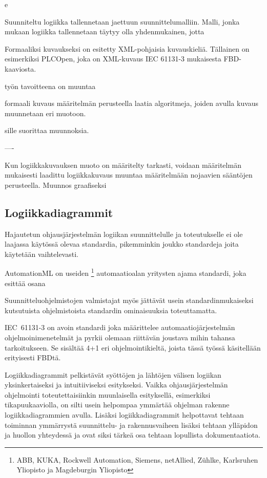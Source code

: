e	\documentclass[finnish,12pt]{article}
\begin{document}
Suunniteltu logiikka tallennetaan jaettuun suunnittelumalliin. Malli, jonka mukaan logiikka tallennetaan täytyy olla yhdenmukainen,
jotta 

Formaaliksi kuvaukseksi on esitetty XML-pohjaisia kuvauskieliä. Tällainen on esimerkiksi PLCOpen, joka on XML-kuvaus
IEC 61131-3 mukaisesta FBD-kaaviosta.




 työn tavoitteena on muuntaa

formaali kuvaus määritelmän perusteella
laatia algoritmeja, joiden avulla kuvaus muunnetaan eri muotoon. 

sille suorittaa muunnoksia.

----

Kun logiikkakuvauksen muoto on määritelty tarkasti, voidaan määritelmän mukaisesti laadittu logiikkakuvaus
muuntaa määritelmään nojaavien sääntöjen perusteella. Muunnos graafiseksi


	\subsection{Logiikkadiagrammit}


Hajautetun ohjausjärjestelmän logiikan suunnittelulle ja toteutukselle ei ole
laajassa käytössä olevaa standardia, pikemminkin joukko standardeja joita
käytetään vaihtelevasti.

AutomationML on useiden \footnote{ABB, KUKA, Rockwell Automation, Siemens, netAllied, Zühlke, Karlsruhen Yliopisto ja Magdeburgin Yliopisto}
automaatioalan yritysten ajama standardi, joka esittää osana 

Suunnitteluohjelmistojen valmistajat myös jättävät usein
standardinmukaiseksi kutsutuista ohjelmistoista standardin
ominaisuuksia toteuttamatta.\cite{RefWorks:42}

IEC~61131-3 on avoin standardi joka määrittelee automaatiojärjestelmän ohjelmoinimenetelmät ja
 pyrkii olemaan riittävän joustava mihin tahansa tarkoitukseen. Se sisältää 4+1 eri
ohjelmointikieltä, joista tässä työssä käsitellään erityisesti FBDtä.

Logiikkadiagrammit pelkistävät syöttöjen ja lähtöjen välisen logiikan
yksinkertaiseksi ja intuitiiviseksi esitykseksi. Vaikka ohjausjärjestelmän
ohjelmointi toteutettaisiinkin muunlaisella esityksellä, esimerkiksi
tikapuukaaviolla, on silti usein helpompaa ymmärtää ohjelman rakenne
logiikkadiagrammien avulla. Lisäksi logiikkadiagrammit helpottavat tehtaan
toiminnan ymmärrystä suunnittelu- ja rakennusvaiheen lisäksi tehtaan ylläpidon
ja huollon yhteydessä ja ovat siksi tärkeä osa tehtaan lopullista
dokumentaatiota.
\end{document}
